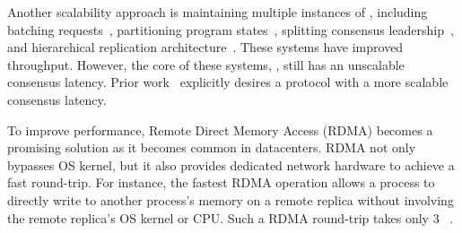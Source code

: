 Another scalability approach is maintaining multiple instances of \paxos, 
including batching requests~\cite{calvin:sigmod12}, partitioning program 
states~\cite{scatter:sosp11,ssmr:dsn14,ellis:thesis,abu2013leveraging,
peluso2015exploiting}, splitting consensus 
leadership~\cite{mencius:osdi08,spaxos:srds12}, and hierarchical 
replication architecture~\cite{manos:hotdep10,scatter:sosp11}. 
These systems have improved throughput. However, the core of these systems, 
\paxos, still has an unscalable consensus latency. Prior
work~\cite{scatter:sosp11,ellis:thesis,manos:hotdep10} explicitly desires a 
\paxos protocol with a more scalable consensus latency.





To improve \paxos performance, Remote Direct Memory Access (RDMA) becomes a 
promising solution as it becomes common in datacenters. RDMA not only bypasses 
OS kernel, but it also provides dedicated network hardware to achieve a fast 
round-trip. For instance, the fastest RDMA operation allows a process to 
directly write to another process's memory on a remote replica without 
involving the remote replica's OS kernel or CPU. Such a RDMA round-trip takes 
only 3 \us~\cite{pilaf:usenix14}.

